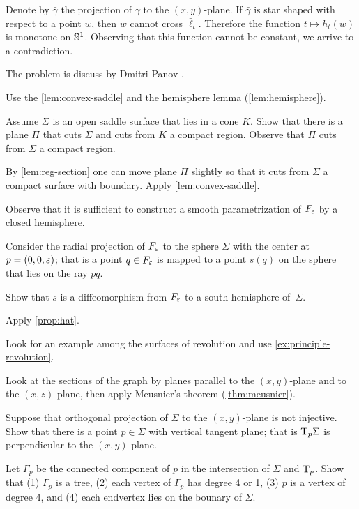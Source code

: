 Denote by $\bar\gamma$ the projection of $\gamma$ to the $(x, y)$-plane.
If $\bar\gamma$ is star shaped with respect to a point $w$, then $w$ cannot cross $\bar\ell_t$.
Therefore the function $t\mapsto h_t(w)$ is monotone on $\mathbb{S}^1$.
Observing that this function cannot be constant, we arrive to a contradiction.

 The problem is discuss by Dmitri Panov \cite{panov-curves}.

 Use the \ref{lem:convex-saddle} and the hemisphere lemma (\ref{lem:hemisphere}).

Assume $\Sigma$ is an open saddle surface that lies in a cone $K$.
Show that there is a plane $\Pi$ that cuts $\Sigma$ and cuts from $K$ a compact region.
Observe that $\Pi$ cuts from $\Sigma$ a compact region.

By \ref{lem:reg-section} one can move plane $\Pi$ slightly so that it cuts from $\Sigma$ a compact surface with boundary.
Apply \ref{lem:convex-saddle}.


 Observe that it is sufficient to construct a smooth parametrization of $F_\varepsilon$ by a closed hemisphere.

Consider the radial projection of $F_\varepsilon$ to the sphere $\Sigma$ with the center at $p=(0,0,\varepsilon)$;
that is a point $q\in F_\varepsilon$ is mapped to a point $s(q)$ on the sphere that lies on the ray $pq$.

Show that $s$ is a diffeomorphism from $F_\varepsilon$ to a south hemisphere of~$\Sigma$.

 Apply \ref{prop:hat}.

 Look for an example among the surfaces of revolution and use \ref{ex:principle-revolution}.

 Look at the sections of the graph by planes parallel to the $(x,y)$-plane and to the $(x,z)$-plane, then apply Meusnier’s theorem (\ref{thm:meusnier}).

Suppose that orthogonal projection of $\Sigma$ to the $(x,y)$-plane is not injective.
Show that there is a point $p\in\Sigma$ with vertical tangent plane;
that is $\mathrm{T}_p\Sigma$ is perpendicular to the $(x,y)$-plane.

Let $\Gamma_p$ be the connected component of $p$ in the intersection of $\Sigma$ and $\mathrm{T}_p$.
Show that (1) $\Gamma_p$ is a tree, (2) each vertex of $\Gamma_p$ has degree 4 or 1, (3) $p$ is a vertex of degree 4, and (4) each endvertex lies on the bounary of $\Sigma$.

